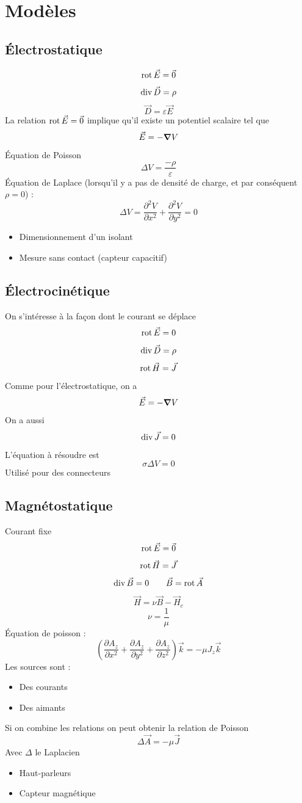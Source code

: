 \documentclass[resume]{subfiles}
\begin{document}
\section{Modèles}
\subsection{Électrostatique}
$$\operatorname{rot}\vec{E}=\vec{0}$$
$$\operatorname{div}\vec{D}=\rho$$
$$\vec{D}=\varepsilon\vec{E}$$
La relation $\operatorname{rot}\vec{E}=\vec{0}$ implique qu'il existe un potentiel scalaire tel que
$$\vec{E}=-\grad V$$
Équation de Poisson
$$\Delta V=\frac{-\rho}{\varepsilon}$$
Équation de Laplace (lorsqu'il y a pas de densité de charge, et par conséquent $\rho=0$) :
$$\Delta V=\frac{\partial^2V}{\partial x^2}+\frac{\partial^2 V}{\partial y^2}=0$$
\begin{itemize}
\item Dimensionnement d'un isolant
\item Mesure sans contact (capteur capacitif)
\end{itemize}

\subsection{Électrocinétique}
On s'intéresse à la façon dont le courant se déplace
$$\operatorname{rot}\vec{E}=0$$
$$\operatorname{div}\vec{D}=\rho$$
$$\operatorname{rot}\vec{H}=\vec{J}$$
Comme pour l'électrostatique, on a
$$\vec{E}=-\grad V$$
On a aussi
$$\operatorname{div}\vec{J}=0$$
L'équation à résoudre est
$$\sigma \Delta V=0$$
Utilisé pour des connecteurs
\subsection{Magnétostatique}
Courant fixe
$$\operatorname{rot}\vec{E}=\vec{0}$$
$$\operatorname{rot}\vec{H}=\vec{J}$$
$$\operatorname{div}\vec{B}=0\qquad \vec{B}=\operatorname{rot}\vec{A}$$
$$\vec{H}=\nu\vec{B}-\vec{H}_c$$
$$\nu=\frac{1}{\mu}$$
Équation de poisson :
$$\left(\frac{\partial A_z}{\partial x^2}+\frac{\partial A_z}{\partial y^2}+\frac{\partial A_z}{\partial z^2}\right)\vec{k}=-\mu J_z\vec{k}$$
Les sources sont :
\begin{itemize}
\item Des courants
\item Des aimants
\end{itemize}
Si on combine les relations on peut obtenir la relation de Poisson
$$\Delta \vec{A}=-\mu \vec{J}$$
Avec $\Delta$ le Laplacien
\begin{itemize}
\item Haut-parleurs
\item Capteur magnétique
\end{itemize}
\end{document}
